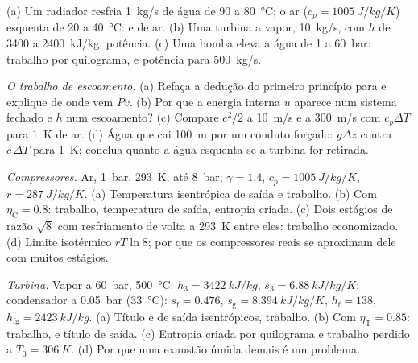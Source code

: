 \begin{exercise}[$\star$]\label{exo:b2:open-systems:4}
(a) Um radiador resfria \qty{1}{kg/s} de água de \qty{90}{} a \qty{80}{\celsius};
o ar ($c_p = \qty{1005}{J/kg/K}$) esquenta de \qty{20}{} a \qty{40}{\celsius}:
 e  de ar. (b) Uma turbina a vapor, \qty{10}{kg/s},
com $h$ de \qty{3400}{} a \qty{2400}{kJ/kg}: potência. (c) Uma bomba eleva a
água de \qty{1}{} a \qty{60}{bar}: trabalho por quilograma, e potência para
\qty{500}{kg/s}.
\end{exercise}

\begin{exercise}[$\star\star$]\label{exo:b2:open-systems:5}
\emph{O trabalho de escoamento.} (a) Refaça a dedução do primeiro princípio para  e
explique de onde vem $Pv$. (b) Por que a energia interna $u$
aparece num sistema fechado e $h$ num escoamento? (c) Compare $c^2/2$ a
\qty{10}{m/s} e a \qty{300}{m/s} com $c_p\Delta T$ para \qty{1}{K} de ar.
(d) Água que cai \qty{100}{m} por um conduto forçado: $g\Delta z$ contra
$c\,\Delta T$ para \qty{1}{K}; conclua quanto a água esquenta se a
turbina for retirada.
\end{exercise}

\begin{exercise}[$\star\star$]\label{exo:b2:open-systems:6}
\emph{Compressores.} Ar, \qty{1}{bar}, \qty{293}{K}, até \qty{8}{bar}; $\gamma =
1.4$, $c_p = \qty{1005}{J/kg/K}$, $r = \qty{287}{J/kg/K}$. (a) Temperatura
isentrópica de saída e trabalho. (b) Com $\eta_{\text{C}} = 0.8$: trabalho, temperatura
de saída, entropia criada. (c) Dois estágios de razão $\sqrt8$ com
resfriamento de volta a \qty{293}{K} entre eles: trabalho economizado. (d) Limite
isotérmico $rT\ln 8$; por que os compressores reais se aproximam dele com muitos estágios.
\end{exercise}

\begin{exercise}[$\star\star$]\label{exo:b2:open-systems:7}
\emph{Turbina.} Vapor a \qty{60}{bar}, \qty{500}{\celsius}: $h_3 = \qty{3422}{kJ/kg}$,
$s_3 = \qty{6.88}{kJ/kg/K}$; condensador a \qty{0.05}{bar} (\qty{33}{\celsius}):
$s_{\text{f}} = 0.476$, $s_{\text{g}} = \qty{8.394}{kJ/kg/K}$, $h_{\text{f}} = 138$,
$h_{\text{fg}} = \qty{2423}{kJ/kg}$. (a) Título e  de saída
isentrópicos, trabalho. (b) Com $\eta_{\text{T}} = 0.85$: trabalho,  e
título de saída. (c) Entropia criada por quilograma e trabalho perdido a $T_0 =
\qty{306}{K}$. (d) Por que uma exaustão úmida demais é um problema.
\end{exercise}

